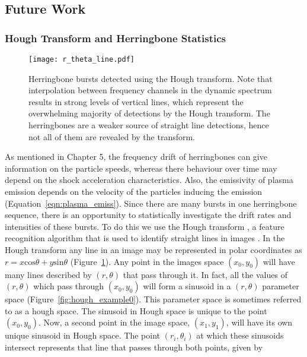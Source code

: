 \subsection{Future Work}

\subsubsection{Hough Transform and Herringbone Statistics}
\begin{figure}[t!]
\begin{center}
\texttt{[image: r\_theta\_line.pdf]}
\caption[Hough transform herringbones]{Herringbone bursts detected using the Hough transform. Note that interpolation between frequency channels in the dynamic spectrum results in strong levels of vertical lines, which represent the overwhelming majority of detections by the Hough transform. The herringbones are a weaker source of straight line detections, hence not all of them are revealed by the transform.}
\label{fig:r_theta_line}
\end{center}
\end{figure}
As mentioned in Chapter 5, the frequency drift of herringbones can give information on the particle speeds, whereas there behaviour over time may depend on the shock acceleration characteristics. Also, the emissivity of plasma emission depends on the velocity of the particles inducing the emission (Equation~\ref{eqn:plasma_emiss}). Since there are many bursts in one herringbone sequence, there is an opportunity to statistically investigate the drift rates and intensities of these bursts. To do this we use the Hough transform \citep{hough1961}, a feature recognition algorithm that is used to identify straight lines in images \citep{duda1972}. In the Hough transform any line in an image may be represented in polar coordinates as $r=x\mathrm{cos}\theta +y\mathrm{sin}\theta$ (Figure~\ref{fig:r_theta_line}). Any point in the images space $(x_0, y_0)$ will have many lines described by $(r,\theta)$ that pass through it. In fact, all the values of $(r, \theta)$ which pass through $(x_0, y_0)$ will form a sinusoid in a $(r,\theta)$ parameter space (Figure~\ref{fig:hough_example0}). This parameter space is sometimes referred to as a hough space. The sinusoid in Hough space is unique to the point $(x_0, y_0)$. Now, a second point in the image space, $(x_1, y_1)$, will have its own unique sinusoid in Hough space. The point $(r_i,\theta_i)$ at which these sinusoids intersect represents that line that passes through both points, given by
